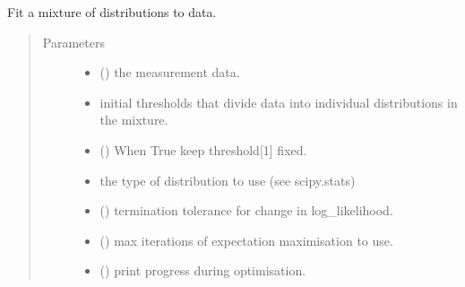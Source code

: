 \documentclass[letterpaper,10pt,english]{sphinxmanual}
\begin{document}
\begin{fulllineitems}
\label{\detokenize{tes:tes.analysis.expectation_maximisation}}
\sphinxAtStartPar
Fit a mixture of distributions to data.
\begin{quote}\begin{description}
\item[{Parameters}] \leavevmode\begin{itemize}
\item {} 
\sphinxAtStartPar
{} () \textendash{} the measurement data.

\item {} 
\sphinxAtStartPar
{} \textendash{} initial thresholds that divide data into
individual distributions in the mixture.

\item {} 
\sphinxAtStartPar
{} () \textendash{} When True keep threshold{[}1{]} fixed.

\item {} 
\sphinxAtStartPar
{} \textendash{} the type of distribution to use (see scipy.stats)

\item {} 
\sphinxAtStartPar
{} () \textendash{} termination tolerance for change in log\_likelihood.

\item {} 
\sphinxAtStartPar
{} () \textendash{} max iterations of expectation maximisation to use.

\item {} 
\sphinxAtStartPar
{} () \textendash{} print progress during optimisation.


\end{itemize}
\end{description}
\end{quote}
\end{fulllineitems}
\end{document}
